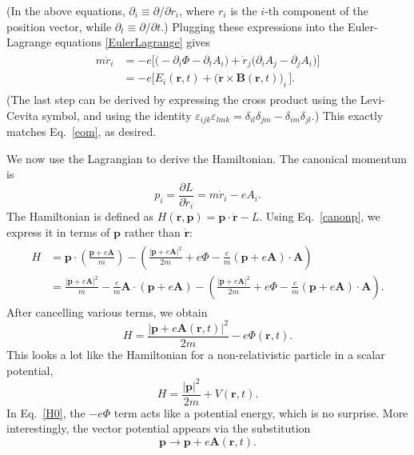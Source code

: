 \documentclass[pra,12pt]{revtex4}
\begin{document}
(In the above equations, $\partial_i \equiv \partial/\partial r_i$,
where $r_i$ is the $i$-th component of the position vector, while
$\partial_t \equiv \partial/\partial t$.)  Plugging these expressions
into the Euler-Lagrange equations \eqref{EulerLagrange} gives
\begin{align}
  \begin{aligned}
    m\ddot{r}_i &=
    -e\Big[\Big(-\partial_i \Phi - \partial_t A_i\Big)
      + \dot{r}_j \Big( \partial_i A_j - \partial_j A_i\Big) \Big] \\
    &= -e \Big[E_i(\mathbf{r},t) + \big(\dot{\mathbf{r}} \times
      \mathbf{B}(\mathbf{r},t) \big)_i\, \Big].
  \end{aligned}
\end{align}
(The last step can be derived by expressing the cross product using
the Levi-Cevita symbol, and using the identity $\varepsilon_{ijk}
\varepsilon_{lmk} = \delta_{il} \delta_{jm} - \delta_{im}
\delta_{jl}$.)  This exactly matches Eq.~\eqref{eom}, as desired.

We now use the Lagrangian to derive the Hamiltonian.  The canonical
momentum is
\begin{equation}
  p_i = \frac{\partial L}{\partial \dot{r}_i} = m\dot{r}_i - e A_i.
  \label{canonp}
\end{equation}
The Hamiltonian is defined as $H(\mathbf{r},\mathbf{p}) = \mathbf{p}
\cdot \dot{\mathbf{r}} - L$.  Using Eq.~\eqref{canonp}, we express it
in terms of $\mathbf{p}$ rather than $\dot{\mathbf{r}}$:
\begin{align}
  \begin{aligned}
    H &= \mathbf{p}\cdot \left(\frac{\mathbf{p}+e\mathbf{A}}{m}\right)
    - \left(\frac{|\mathbf{p}+e\mathbf{A}|^2}{2m}
    + e\Phi - \frac{e}{m}(\mathbf{p}+e\mathbf{A})\cdot \mathbf{A}\right) \\
    &= \frac{|\mathbf{p}+e\mathbf{A}|^2}{m}
    - \frac{e}{m}\mathbf{A}\cdot \left(\mathbf{p}+e\mathbf{A}\right)
    - \left(\frac{|\mathbf{p}+e\mathbf{A}|^2}{2m}
    + e\Phi - \frac{e}{m}(\mathbf{p}+e\mathbf{A})\cdot \mathbf{A}\right).
  \end{aligned}
\end{align}
After cancelling various terms, we obtain
\begin{equation}
  H = \frac{|\mathbf{p}+e\mathbf{A}(\mathbf{r},t)|^2}{2m} - e\Phi(\mathbf{r},t).
  \label{H0}
\end{equation}
This looks a lot like the Hamiltonian for a non-relativistic particle
in a scalar potential,
\begin{equation*}
  H = \frac{|\mathbf{p}|^2}{2m} + V(\mathbf{r},t).
\end{equation*}
In Eq.~\eqref{H0}, the $-e\Phi$ term acts like a potential energy,
which is no surprise.  More interestingly, the vector potential
appears via the substitution
\begin{equation}
  \mathbf{p} \rightarrow \mathbf{p} + e\mathbf{A}(\mathbf{r},t).  
\end{equation}
\end{document}
